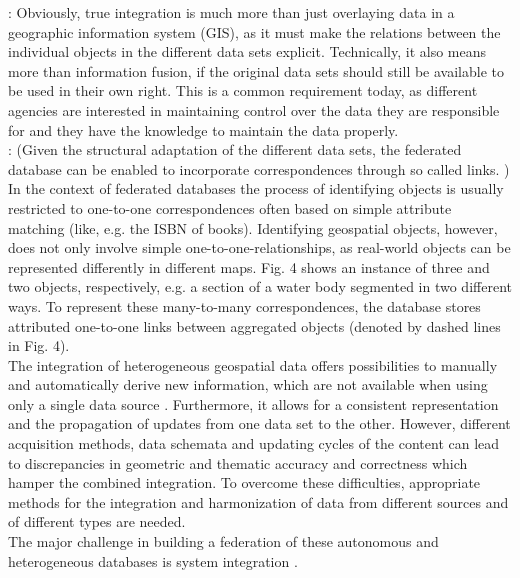 \documentclass[12pt,a4paper]{report}
\begin{document}
	\citep{Butenuth}: Obviously, true integration is much more than just overlaying data in a geographic information system (GIS), as it must make the relations between the individual objects in the different data sets explicit. Technically, it also means more than information fusion, if the original data sets should still be available to be used in their own right. This is a common requirement today, as different agencies are interested in maintaining control over the data they are responsible for and they have the knowledge to maintain the data properly.
	\\


	\citep{Butenuth}: (Given the structural adaptation of the different data sets, the federated database can be enabled to incorporate correspondences through so called links. ) In the context of federated databases the process of identifying objects is usually restricted to one-to-one correspondences often based on simple attribute matching (like, e.g. the ISBN of books). Identifying geospatial objects, however, does not only involve simple one-to-one-relationships, as real-world objects can be represented differently in different maps. Fig. 4 shows an instance of three and two objects, respectively, e.g. a section of a water body segmented in two different ways. To represent these many-to-many correspondences, the database stores attributed one-to-one links between aggregated objects (denoted by dashed lines in Fig. 4).
	\\


	The integration of heterogeneous geospatial data offers possibilities to manually and automatically derive new information, which are not available when using only a single data source \citep{Butenuth}. Furthermore, it allows for a consistent representation and the propagation of updates from one data set to the other. However, different acquisition methods, data schemata and updating cycles of the content can lead to discrepancies in geometric and thematic accuracy and correctness which hamper the combined integration. To overcome these difficulties, appropriate methods for the integration and harmonization of data from different sources and of different types are needed.
	\\

	The major challenge in building a federation of these autonomous and heterogeneous databases is system integration \citep{Malik}.
	\\
\end{document}
